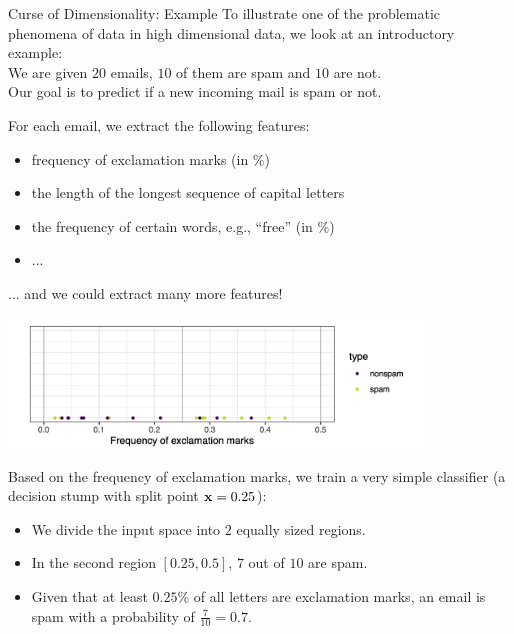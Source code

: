 \begin{vbframe}{Curse of Dimensionality: Example}
To illustrate one of the problematic phenomena of data in high dimensional data, we look at an introductory example: \\ \lz
We are given $20$ emails, $10$ of them are spam and $10$ are not. \\
Our goal is to predict if a new incoming mail is spam or not.

\medskip

For each email, we extract the following features:

\begin{itemize}
\item frequency of exclamation marks (in \%)
\item the length of the longest sequence of capital letters
\item the frequency of certain words, e.g., \enquote{free} (in \%)
\item ...
\end{itemize}

... and we could extract many more features!

\framebreak



\vspace*{0.1cm}
\begin{center}
\includegraphics[width = 11cm ]{figure_man/exclamation_marks.png}
\end{center}

Based on the frequency of exclamation marks, we train a very simple classifier (a decision stump with split point $\mathbf{x} = 0.25$):

\begin{itemize}
\item We divide the input space into $2$ equally sized regions.
\item In the second region $[0.25, 0.5]$, $7$ out of $10$ are spam.
\item Given that at least $0.25\%$ of all letters are exclamation marks, an email is spam with a probability of $\frac{7}{10} = 0.7$.
\end{itemize}
\framebreak



\end{vbframe}

